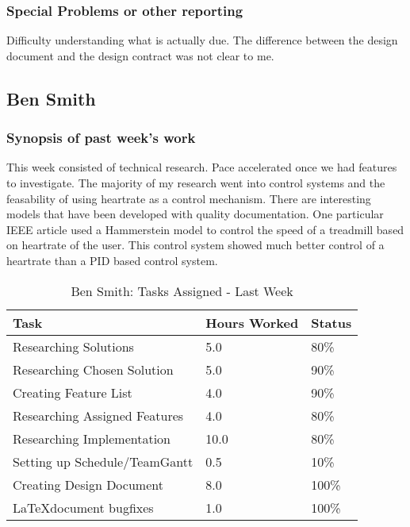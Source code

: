 \documentclass[12pt,article,compsoc]{IEEEtran}
\begin{document}
	\subsubsection*{Special Problems or other reporting}
	Difficulty understanding what is actually due. The difference between the design document and the design
    contract was not clear to me.
\subsection{Ben Smith}

	\subsubsection*{Synopsis of past week's work}
	This week consisted of technical research. Pace accelerated once we had features to investigate.
	The majority of my research went into control systems and the feasability of using heartrate as a
    control mechanism. There are interesting models that have been developed with quality documentation.
    One particular IEEE article used a Hammerstein model to control the speed of a treadmill based on
    heartrate of the user. This control system showed much better control of a heartrate than a PID
    based control system.

	\begin{table}[ht]
	\renewcommand{\arraystretch}{1.3}
		\caption{Ben Smith: Tasks Assigned - Last Week}
		
		\label{Summary of Ben Smith's activities: last week}
		
		\centering
		\begin{tabular}{p{5.5cm}|p{1cm}|p{1cm}}

		\hline
		\bfseries 		Task				            	& \bfseries Hours Worked		& \bfseries Status	\\
		\hline\hline
					Researching Solutions    				& 5.0							& 80\%				\\
					Researching Chosen Solution				& 5.0							& 90\%				\\
					Creating Feature List					& 4.0							& 90\%				\\
                    Researching Assigned Features           & 4.0                           & 80\%              \\
                    Researching Implementation				& 10.0	    					& 80\%				\\
					Setting up Schedule/TeamGantt			& 0.5							& 10\%				\\
					Creating Design Document				& 8.0							& 100\%				\\
                    \LaTeX document bugfixes                & 1.0                           & 100\%             \\
		\hline
		\end{tabular}
	\end{table}
\end{document}
